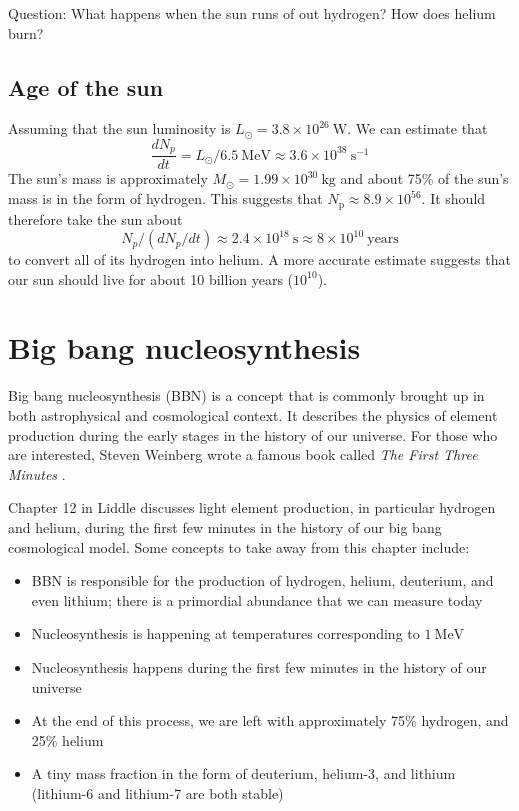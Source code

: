 \documentclass[a4paper,12pt]{article}
\theoremstyle{remark}
\newcommand{\mrm}[1]{\mathrm{#1}}
\renewcommand{\=}[1]{\stackrel{#1}{=}} %
\theoremstyle{plain}
\theoremstyle{definition}
\begin{document}
Question: What happens when the sun runs of out hydrogen? How does helium burn?

\subsection{Age of the sun}
Assuming that the sun luminosity is $L_\odot = 3.8 \times 10^{26} \:\mrm{W}$. We can estimate that 
\begin{equation}
\frac{dN_p}{dt} = L_\odot / 6.5 \:\mrm{MeV} \approx 3.6 \times 10^{38} \:\mrm{s}^{-1}
\end{equation}
The sun's mass is approximately $M _\odot = 1.99 \times 10^{30} \:\mrm{kg}$ and about 75\% of the sun's mass is in the form of hydrogen. This suggests that $N_\mrm{p} \approx 8.9 \times 10^{56}$. It should therefore take the sun about 
\begin{equation}
N_p / (dN_p / dt) \approx 2.4 \times 10^{18} \: \mrm{s} \approx 8 \times 10^{10} \:\mrm{years}
\end{equation}
to convert all of its hydrogen into helium. A more accurate estimate suggests that our sun should live for about 10 billion years ($10^{10}$).

\section{Big bang nucleosynthesis}
Big bang nucleosynthesis (BBN) is a concept that is commonly brought up in both astrophysical and cosmological context. It describes the physics of element production during the early stages in the history of our universe. For those who are interested, Steven Weinberg wrote a famous book called \textit{The First Three Minutes} \cite{Weinberg1993}.

Chapter 12 in Liddle discusses light element production, in particular hydrogen and helium, during the first few minutes in the history of our big bang cosmological model. Some concepts to take away from this chapter include:
\begin{itemize}
\item BBN is responsible for the production of hydrogen, helium, deuterium, and even lithium; there is a primordial abundance that we can measure today
\item Nucleosynthesis is happening at temperatures corresponding to $1 \:\mrm{MeV}$
\item Nucleosynthesis happens during the first few minutes in the history of our universe
\item At the end of this process, we are left with approximately 75\% hydrogen, and 25\% helium
\item A tiny mass fraction in the form of deuterium, helium-3, and lithium (lithium-6 and lithium-7 are both stable)
\end{itemize}
\end{document}
